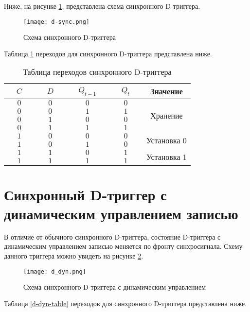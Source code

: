 Ниже, на рисунке \ref{d-sync}, представлена схема синхронного D-триггера.

\begin{figure}
	\centering
	\texttt{[image: d-sync.png]}
	\caption{Схема синхронного D-триггера}
	\label{d-sync}
\end{figure}

Таблица \ref{d-sync-table} переходов для синхронного D-триггера представлена ниже.

\begin{table}
	\centering
	\caption{Таблица переходов синхронного D-триггера}
	\begin{tabular}{|c|c|c|c|c|}
		\hline
		$~~~~~C~~~~~$ & $~~~~~D~~~~~$ & $~~~~~Q_{t-1}~~~~~$ & $~~~~~Q_t~~~~~$ & Значение \\
		\hline
		$0$ & $0$ & $0$ & $0$ &  \multirow{4}{*}{Хранение} \\
		\cline{1-4}
		$0$ & $0$ & $1$ & $1$ & \\
		\cline{1-4}
		$0$ & $1$ & $0$ & $0$ & \\
		\cline{1-4}
		$0$ & $1$ & $1$ & $1$ & \\
		\hline
		$1$ & $0$ & $0$ & $0$ &  \multirow{2}{*}{Установка 0} \\
		\cline{1-4}
		$1$ & $0$ & $1$ & $0$ & \\
		\hline
		$1$ & $1$ & $0$ & $1$ &  \multirow{2}{*}{Установка 1} \\
		\cline{1-4}
		$1$ & $1$ & $1$ & $1$ & \\
		\hline
	\end{tabular}
	\label{d-sync-table}
\end{table}

\pagebreak

\section{Синхронный D-триггер с динамическим управлением записью}

В отличие от обычного синхронного D-триггера, состояние D-триггера с динамическим управлением записью меняется по фронту синхросигнала. Схему данного триггера можно увидеть на рисунке \ref{d-dyn}.

\begin{figure}
	\centering
	\texttt{[image: d\_dyn.png]}
	\caption{Схема синхронного D-триггера с динамическим управлением}
	\label{d-dyn}
\end{figure}

Таблица \ref{d-dyn-table} переходов для синхронного D-триггера представлена ниже.

